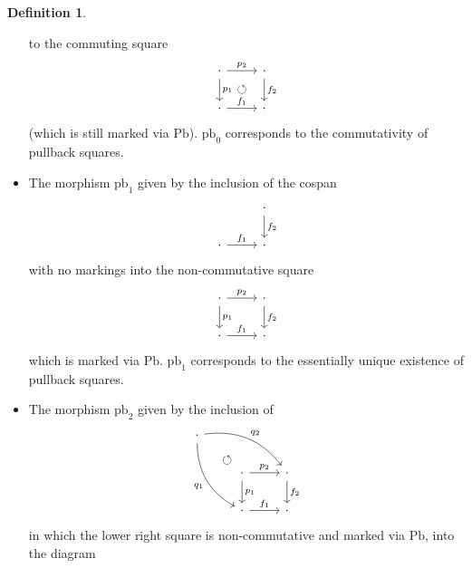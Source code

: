 \documentclass[a4paper]{article}
\theoremstyle{remark}
\theoremstyle{definition}
\newtheorem{definition}[theorem]{Definition}
\begin{document}
\begin{definition}
\begin{itemize}
      to the commuting square
      \begin{equation}
        \begin{tikzcd}
          \cdot \arrow[dr, phantom, "\circlearrowleft"] \arrow[r, "p_2"] \arrow[d, "p_1"] & \cdot \arrow[d, "f_2"] \\
          \cdot \arrow[r, "f_1"] & \cdot
        \end{tikzcd}
      \end{equation}
      (which is still marked via $\mathrm{Pb}$).
      $\mathrm{pb}_0$ corresponds to the commutativity of pullback squares.
    \item
      \label{itm:pbs-exist}
      The morphism $\mathrm{pb}_1$ given by the inclusion of the cospan
      \begin{equation}
        \begin{tikzcd}
            & \cdot \arrow[d, "f_2"] \\
            \cdot \arrow[r, "f_1"] & \cdot 
        \end{tikzcd}
      \end{equation}
      with no markings into the non-commutative square
      \begin{equation}
        \begin{tikzcd}
          \cdot \arrow[r, "p_2"] \arrow[d, "p_1"] & \cdot \arrow[d, "f_2"] \\
          \cdot \arrow[r, "f_1"] & \cdot
        \end{tikzcd}
      \end{equation}
      which is marked via $\mathrm{Pb}$.
      $\mathrm{pb}_1$ corresponds to the essentially unique existence of pullback squares.
    \item
      \label{itm:pbs-factorizations}
      The morphism $\mathrm{pb}_2$ given by the inclusion of
      \begin{equation}
        \begin{tikzcd}
          \cdot \arrow[ddr, bend right, "q_1"'] \arrow[drr, bend left, "q_2"] \arrow[dr, phantom, "\circlearrowleft", near end] \\
          & \cdot \arrow[d, "p_1"] \arrow[r, "p_2"] & \cdot \arrow[d, "f_2"] \\
          & \cdot \arrow[r, "f_1"] & \cdot
        \end{tikzcd}
      \end{equation}
      in which the lower right square is non-commutative and marked via $\mathrm{Pb}$, into the diagram
      \begin{equation}

\end{equation}
\end{itemize}
\end{definition}
\end{document}
